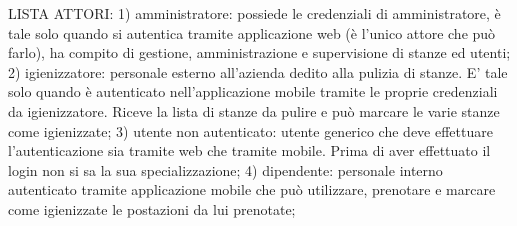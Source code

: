 LISTA ATTORI:
1) amministratore: possiede le credenziali di amministratore, è tale solo quando si autentica tramite applicazione web (è l'unico attore che può farlo), ha compito di gestione, amministrazione e supervisione di stanze ed utenti;
2) igienizzatore: personale esterno all'azienda dedito alla pulizia di stanze. E' tale solo quando è autenticato nell'applicazione mobile tramite le proprie credenziali da igienizzatore. Riceve la lista di stanze da pulire e può marcare le varie stanze come igienizzate;
3) utente non autenticato: utente generico che deve effettuare l'autenticazione sia tramite web che tramite mobile. Prima di aver effettuato il login non si sa la sua specializzazione;
4) dipendente: personale interno autenticato tramite applicazione mobile che può utilizzare, prenotare e marcare come igienizzate le postazioni da lui prenotate;

